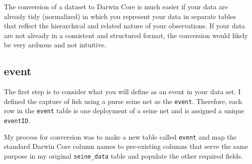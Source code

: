 \documentclass[]{book}
\newenvironment{Shaded}{\begin{snugshade}}{\end{snugshade}}
\newcommand{\CommentTok}[1]{\textcolor[rgb]{0.56,0.35,0.01}{\textit{#1}}}
\newcommand{\DataTypeTok}[1]{\textcolor[rgb]{0.13,0.29,0.53}{#1}}
\newcommand{\DecValTok}[1]{\textcolor[rgb]{0.00,0.00,0.81}{#1}}
\newcommand{\KeywordTok}[1]{\textcolor[rgb]{0.13,0.29,0.53}{\textbf{#1}}}
\newcommand{\NormalTok}[1]{#1}
\newcommand{\OperatorTok}[1]{\textcolor[rgb]{0.81,0.36,0.00}{\textbf{#1}}}
\newcommand{\StringTok}[1]{\textcolor[rgb]{0.31,0.60,0.02}{#1}}
\begin{document}
The conversion of a dataset to Darwin Core is much easier if your data are already tidy (normalized) in which you represent your data in separate tables that reflect the hierarchical and related nature of your observations. If your data are not already in a consistent and structured format, the conversion would likely be very arduous and not intuitive.

\hypertarget{event}{%
\subsection{event}\label{event}}

The first step is to consider what you will define as an event in your data set. I defined the capture of fish using a purse seine net as the \texttt{event}. Therefore, each row in the \texttt{event} table is one deployment of a seine net and is assigned a unique \texttt{eventID}.

My process for conversion was to make a new table called \texttt{event} and map the standard Darwin Core column names to pre-existing columns that serve the same purpose in my original \texttt{seine\_data} table and populate the other required fields.

\begin{Shaded}
\end{Shaded}
\end{document}

